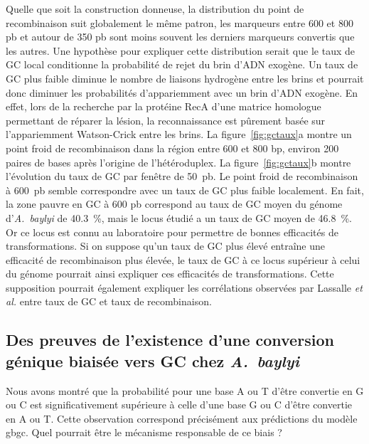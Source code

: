 Quelle que soit la construction donneuse, la distribution du point de
recombinaison suit globalement le même patron, les marqueurs entre \num{600} et
\num{800} pb et autour de \num{350} pb sont moins souvent les derniers marqueurs
convertis que les autres. Une hypothèse pour expliquer cette distribution serait
que le taux de GC local conditionne la probabilité de rejet du brin d'ADN
exogène. Un taux de GC plus faible diminue le nombre de liaisons hydrogène entre
les brins et pourrait donc diminuer les probabilités d'appariemment avec un brin
d'ADN exogène. En effet, lors de la recherche par la protéine RecA d'une matrice
homologue permettant de réparer la lésion, la reconnaissance est pûrement basée
sur l'appariemment Watson-Crick entre les brins\cite{lee_base_2015}. La
figure~\ref{fig:gctaux}a montre un point froid de recombinaison dans la région
entre \num{600} et \num{800} bp, environ \num{200} paires de bases après
l'origine de l'hétéroduplex. La figure~\ref{fig:gctaux}b montre l'évolution du
taux de GC par fenêtre de \num{50}~pb. Le point froid de recombinaison à
\num{600}~pb semble correspondre avec un taux de GC plus faible localement. En
fait, la zone pauvre en GC à \num{600} pb correspond au taux de GC moyen du
génome d'\emph{A.~baylyi} de \SI{40.3}{\percent}, mais le locus étudié a un taux
de GC moyen de \SI{46.8}{\percent}. Or ce locus est connu au laboratoire pour
permettre de bonnes efficacités de transformations. Si on suppose qu'un taux de
GC plus élevé entraîne une efficacité de recombinaison plus élevée, le taux de
GC à ce locus supérieur à celui du génome pourrait ainsi expliquer ces
efficacités de transformations. Cette supposition pourrait également expliquer
les corrélations observées par Lassalle \emph{et
  al.}\cite{lassalle_gc-content_2015} entre taux de GC et taux de recombinaison.

\subsection{Des preuves de l'existence d'une conversion génique biaisée vers GC
  chez \textit{A.~baylyi}}

Nous avons montré que la probabilité pour une base A ou T d'être convertie en G
ou C est significativement supérieure à celle d'une base G ou C d'être convertie
en A ou T. Cette observation correspond précisément aux prédictions du modèle
\ac{gbgc}. Quel pourrait être le mécanisme responsable de ce biais ?

\afterpage{\blankpage}

